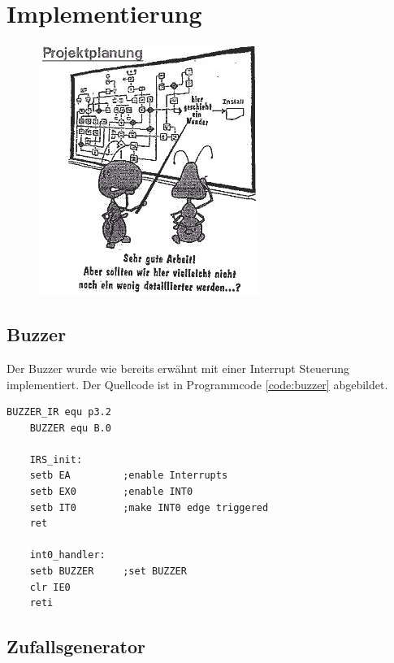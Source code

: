 \chapter{Implementierung}

\begin{figure}[htbp]
	\centering
	\includegraphics[scale=1.5]{img/wunder}
\end{figure}


\section{Buzzer}

Der Buzzer wurde wie bereits erwähnt mit einer Interrupt Steuerung implementiert. Der Quellcode ist in Programmcode \ref{code:buzzer} abgebildet. 

\noindent
\begin{minipage}[t]{\textwidth}
	\vspace{1em}
	\begin{lstlisting}[caption=Quellcode für den Buzzer Interrupt, label=code:buzzer]
	BUZZER_IR equ p3.2
	BUZZER equ B.0
	
	IRS_init:
	setb EA			;enable Interrupts
	setb EX0		;enable INT0
	setb IT0		;make INT0 edge triggered
	ret
	
	int0_handler:
	setb BUZZER		;set BUZZER
	clr IE0
	reti	
	\end{lstlisting}
\end{minipage}

\section{Zufallsgenerator}

